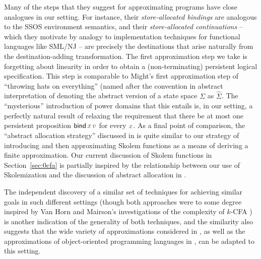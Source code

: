Many of the steps that they suggest for approximating programs have
close analogues in our setting. For instance, their {\it
  store-allocated bindings} are analogous to the SSOS environment
semantics, and their {\it store-allocated continuations} -- which they
motivate by analogy to implementation techniques for functional
languages like SML/NJ -- are precisely the destinations that arise
naturally from the destination-adding transformation. The first
approximation step we take is forgetting about linearity in order to
obtain a (non-terminating) persistent logical specification. This step
is comparable to Might's first approximation step of ``throwing hats
on everything'' (named after the convention in abstract interpretation
of denoting the abstract version of a state space $\Sigma$ as
$\hat{\Sigma}$. The ``mysterious'' introduction of power domains that
this entails is, in our setting, a perfectly natural result of
relaxing the requirement that there be at most one persistent
proposition ${\sf bind}\,\lf{x}\,\lf{v}$ for every $\lf{x}$. 
As a final point of
comparison, the ``abstract allocation strategy'' discussed in
\cite{might10abstracting} is quite similar to our strategy of
introducing and then approximating Skolem functions as a means of
deriving a finite approximation. Our current discussion of Skolem
functions in Section~\ref{sec:0cfa} is partially inspired by the
relationship between our use of Skolemization and the discussion of
abstract allocation in \cite{might10abstracting}.

The independent discovery of a similar set of techniques for achieving
similar goals in such different settings (though both approaches were
to some degree inspired by Van Horn and Mairson's investigations of
the complexity of $k$-CFA \cite{vanhorn07relating}) is another
indication of the generality of both techniques, and the similarity
also suggests that the wide variety of approximations considered in
\cite{might10abstracting}, as well as the approximations of
object-oriented programming languages in \cite{might10abstract}, can
be adapted to this setting.
